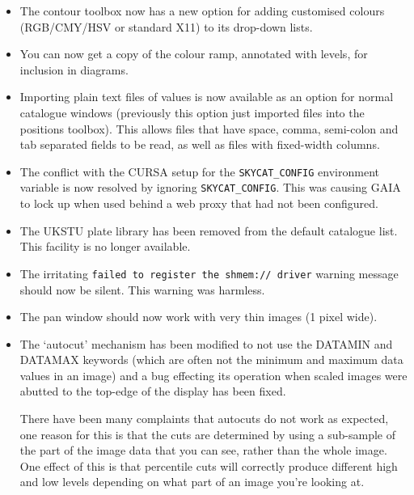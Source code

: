 \documentclass[twoside,11pt]{article}
\newcommand{\xref}[3]{#1}
\renewcommand{\_}{\texttt{\symbol{95}}}
\begin{document}
\begin{itemize}
     \item The contour toolbox now has a new option for adding customised
       colours (RGB/CMY/HSV or standard X11) to its drop-down lists.

     \item You can now get a copy of the colour ramp, annotated with
       levels, for inclusion in diagrams.

     \item Importing plain text files of values is now available as an
       option for normal catalogue windows (previously this option just
       imported files into the positions toolbox). This allows files
       that have space, comma, semi-colon and tab separated fields to be
       read, as well as files with fixed-width columns.

     \item The conflict with the \xref{CURSA}{sun190}{} setup for the
       \verb+SKYCAT_CONFIG+ environment variable is now resolved by ignoring
       \verb+SKYCAT_CONFIG+. This was causing GAIA to lock up when used behind 
       a web proxy that had not been configured.

     \item The UKSTU plate library has been removed from the default
       catalogue list. This facility is no longer available.

     \item The irritating 
           \verb+failed to register the shmem:// driver+ 
       warning message should now be silent. This warning was harmless.

     \item The pan window should now work with very thin images (1 pixel wide).

     \item The `autocut' mechanism has been modified to not use the
       DATAMIN and DATAMAX keywords (which are often not the minimum and
       maximum data values in an image) and a bug effecting its
       operation when scaled images were abutted to the top-edge of the
       display has been fixed.

       There have been many complaints that autocuts do not work as
       expected, one reason for this is that the cuts are determined
       by using a sub-sample of the part of the image data that you
       can see, rather than the whole image. One effect of this is
       that percentile cuts will correctly produce different high and
       low levels depending on what part of an image you're looking
       at.


\end{itemize}
\end{document}
